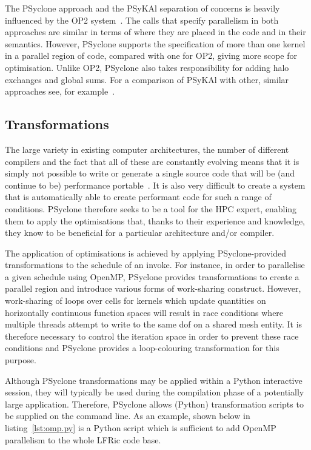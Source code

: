 \documentclass[times]{elsarticle}
\begin{document}
The PSyclone approach and the {PS}y{KA}l separation of concerns is
heavily influenced by the OP2 system~\citep{OP2, PYOP2}. The calls
that specify parallelism in both approaches are similar in terms of
where they are placed in the code and in their semantics. However,
PSyclone supports the specification of more than one kernel in a
parallel region of code, compared with one for OP2, giving more scope
for optimisation. Unlike OP2, PSyclone also takes responsibility for
adding halo exchanges and global sums. For a comparison of {PS}y{KA}l
with other, similar approaches see, for example~\cite{nemolite2d_psykal}.

\subsection{Transformations}

The large variety in existing computer architectures, the number of
different compilers and the fact that all of these are constantly
evolving means that it is simply not possible to write or generate a
single source code that will be (and continue to be) performance
portable~\cite{shallow_psykal, nemolite2d_psykal}.  It is also very
difficult to create a system that is automatically able to create
performant code for such a range of conditions. PSyclone therefore
seeks to be a tool for the HPC expert, enabling them to apply the
optimisations that, thanks to their experience and knowledge, they
know to be beneficial for a particular architecture and/or compiler.

The application of optimisations is achieved by applying
PSyclone-provided transformations to the schedule of an invoke.  For
instance, in order to parallelise a given schedule using OpenMP,
 PSyclone provides transformations to create a parallel region and
introduce various forms of work-sharing construct. However,
work-sharing of loops over cells for kernels which update quantities
on horizontally continuous function spaces will result in race
conditions where multiple threads attempt to write to the same dof on
a shared mesh entity. It
is therefore necessary to control the iteration space in order to
prevent these race conditions and PSyclone provides a loop-colouring
transformation for this purpose.

Although PSyclone transformations may be applied within a Python
interactive session, they will typically be used during the
compilation phase of a potentially large application. Therefore,
PSyclone allows (Python) transformation scripts to be supplied
on the command line. As an example, shown below in
listing~\ref{lst:omp.py} is a Python script which is sufficient
to add OpenMP parallelism to the whole LFRic code base.
\end{document}
